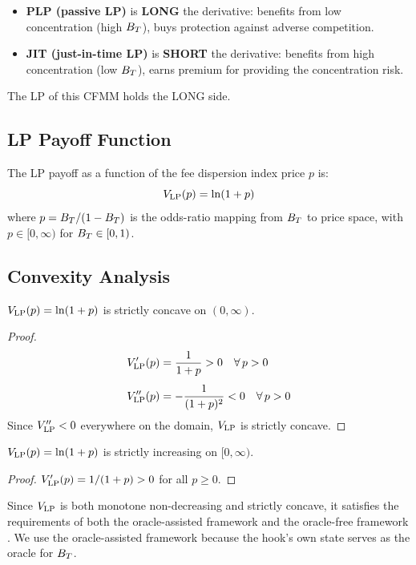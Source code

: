 \begin{itemize}
  \item \textbf{PLP (passive LP)} is \textbf{LONG} the derivative: benefits from low concentration
        (high $B_T$), buys protection against adverse competition.
  \item \textbf{JIT (just-in-time LP)} is \textbf{SHORT} the derivative: benefits from high
        concentration (low $B_T$), earns premium for providing the concentration risk.
\end{itemize}

The LP of this CFMM holds the LONG side.

\subsection{LP Payoff Function}

\begin{definition}[LP Payoff]\label{def:lp-payoff}
The LP payoff as a function of the fee dispersion index price $p$ is:
\begin{equation}\label{eq:lp-payoff}
  V_{\mathrm{LP}}(p) = \ln(1 + p)
\end{equation}
where $p = B_T / (1 - B_T)$ is the odds-ratio mapping from $B_T$ to price space,
with $p \in [0, \infty)$ for $B_T \in [0, 1)$.
\end{definition}

\subsection{Convexity Analysis}

\begin{proposition}[Concavity]\label{prop:concavity}
$V_{\mathrm{LP}}(p) = \ln(1+p)$ is strictly concave on $(0, \infty)$.
\end{proposition}

\begin{proof}
\begin{align}
  V_{\mathrm{LP}}'(p)  &= \frac{1}{1+p} > 0 \quad \forall\, p > 0 \label{eq:V-first-deriv}\\[4pt]
  V_{\mathrm{LP}}''(p) &= -\frac{1}{(1+p)^2} < 0 \quad \forall\, p > 0 \label{eq:V-second-deriv}
\end{align}
Since $V_{\mathrm{LP}}'' < 0$ everywhere on the domain, $V_{\mathrm{LP}}$ is strictly concave. \qedhere
\end{proof}

\begin{proposition}[Monotonicity]\label{prop:monotonicity}
$V_{\mathrm{LP}}(p) = \ln(1+p)$ is strictly increasing on $[0, \infty)$.
\end{proposition}

\begin{proof}
$V_{\mathrm{LP}}'(p) = 1/(1+p) > 0$ for all $p \geq 0$. \qedhere
\end{proof}

\begin{remark}
Since $V_{\mathrm{LP}}$ is both monotone non-decreasing and strictly concave, it satisfies the requirements
of both the oracle-assisted framework \cite{angeris2021replicating} and the oracle-free framework
\cite{angeris2022replicating}. We use the oracle-assisted framework because the hook's own state
serves as the oracle for $B_T$.
\end{remark}

